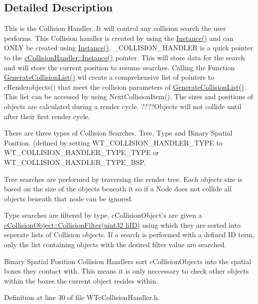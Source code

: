 \subsection{Detailed Description}
This is the Collision Handler. It will control any collision search the user performs. This Collision handler is created by using the \hyperlink{classc_collision_handler_a1c4fee89d756b7c73dd877e732713f69}{Instance()} and can ONLY be created using \hyperlink{classc_collision_handler_a1c4fee89d756b7c73dd877e732713f69}{Instance()}. \_\-COLLISION\_\-HANDLER is a quick pointer to the \hyperlink{classc_collision_handler_a1c4fee89d756b7c73dd877e732713f69}{cCollisionHandler::Instance()} pointer. This will store data for the search and will store the current position to resume searches. Calling the Function \hyperlink{classc_collision_handler_aa52da10a253a2497db9b197c3f0c760d}{GenerateCollisionList()} wil create a comprehensive list of pointers to cRenderobjects() that meet the collision parameters of \hyperlink{classc_collision_handler_aa52da10a253a2497db9b197c3f0c760d}{GenerateCollisionList()}. This list can be accessed by using NextCollisionItem(). The sizes and positions of objects are calculated during a render cycle. ????Objects will not collide until after their first render cycle.

There are three types of Collision Searches. Tree, Type and Binary Spatial Position. (defined by setting WT\_\-COLLISION\_\-HANDLER\_\-TYPE to WT\_\-COLLISION\_\-HANDLER\_\-TYPE\_\-TYPE or WT\_\-COLLISION\_\-HANDLER\_\-TYPE\_\-BSP.

Tree searches are performed by traversing the render tree. Each objects size is based on the size of the objects beneath it so if a Node does not collide all objects beneath that node can be ignored.

Type searches are filtered by type. cCollisionObject's are given a \hyperlink{classc_collision_object_a2a527f445a899adafbf18dddf140e179}{cCollisionObject::CollisionFilter(uint32 liID)} using which they are sorted into seperate lists of Collision objects. If a search is performed with a defined ID term, only the list containing objects with the desired filter value are searched.

Binary Spatial Position Collision Handlers sort cCollisionObjects into the spatial boxes they contact with. This means it is only neccessary to check other objects within the boxes the current object resides within. 

Definition at line 30 of file WTcCollisionHandler.h.



